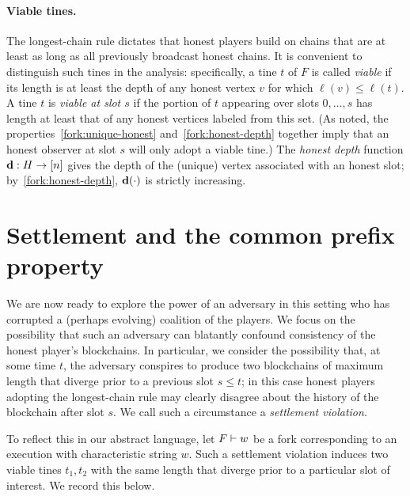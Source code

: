  \paragraph{Viable tines.}
 The longest-chain rule dictates that honest players build on chains
 that are at least as long as all previously broadcast honest
 chains. It is convenient to distinguish such tines in the analysis:
 specifically, a tine $t$ of $F$ is called \emph{viable} if its length
 is at least the depth of any honest vertex $v$ for which
 $\ell(v) \leq \ell(t)$. A tine $t$ is \emph{viable at slot $s$} if
 the portion of $t$ appearing over slots $0,\ldots, s$ has length at
 least that of any honest vertices labeled from this set. (As noted,
 the properties~\ref{fork:unique-honest} and~\ref{fork:honest-depth}
 together imply that an honest observer at slot $s$ will only adopt a
 viable tine.)  The \emph{honest depth} function
 $\mathbf{d} : H \rightarrow [n]$ gives the depth of the (unique) vertex
 associated with an honest slot; by~\ref{fork:honest-depth},
 $\mathbf{d}(\cdot)$ is strictly increasing.
  
  \section{Settlement and the common prefix
    property}\label{sec:cp-settlement}
  
  We are now ready to explore the power of an adversary in this
  setting who has corrupted a (perhaps evolving) coalition of the
  players. We focus on the possibility that such an adversary can
  blatantly confound consistency of the honest player's
  blockchains. In particular, we consider the possibility that, at
  some time $t$, the adversary conspires to produce two blockchains of
  maximum length that diverge prior to a previous slot $s \leq t$; in
  this case honest players adopting the longest-chain rule may clearly
  disagree about the history of the blockchain after slot $s$. We call
  such a circumstance a \emph{settlement violation}.

  To reflect this in our abstract language, let $F \vdash w$ be a fork
  corresponding to an execution with characteristic string $w$. Such a
  settlement violation induces two viable tines $t_1, t_2$ with the
  same length that diverge prior to a particular slot of interest. We
  record this below.
  
